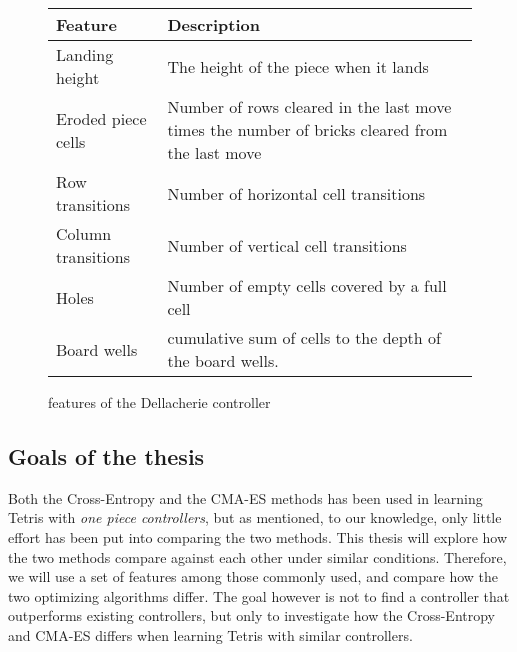 \begin{figure}[h!]
\begin{center}
\begin{tabular}{| l | p{8cm} |}
\hline
\textbf{Feature} & \textbf{Description}\\
\hline
Landing height & The height of the piece when it lands\\
\hline
Eroded piece cells & Number of rows cleared in the last move
times the number of bricks cleared from the last move\\
\hline
Row transitions & Number of horizontal cell transitions\\
\hline
Column transitions & Number of vertical cell transitions \\
\hline
Holes & Number of empty cells covered by a full cell\\
\hline
Board wells & cumulative sum of cells to the depth of
the board wells.\\
\hline
\end{tabular}
\end{center}
\caption{features of the Dellacherie controller \label{table:dellfeat}}
\end{figure}


\subsection{Goals of the thesis}


Both the Cross-Entropy and the CMA-ES methods has been used 
in learning Tetris with \textit{one piece controllers}, but as 
mentioned, to our knowledge, only little effort has been put into 
comparing the two methods. This thesis will explore
how the two methods compare against each other under similar
conditions. Therefore, we will use a set of features among those
commonly used, and compare how the two optimizing algorithms 
differ. The goal however is not to find a controller that 
outperforms existing controllers, but only to investigate 
how the Cross-Entropy and CMA-ES differs when learning Tetris
with similar controllers.

